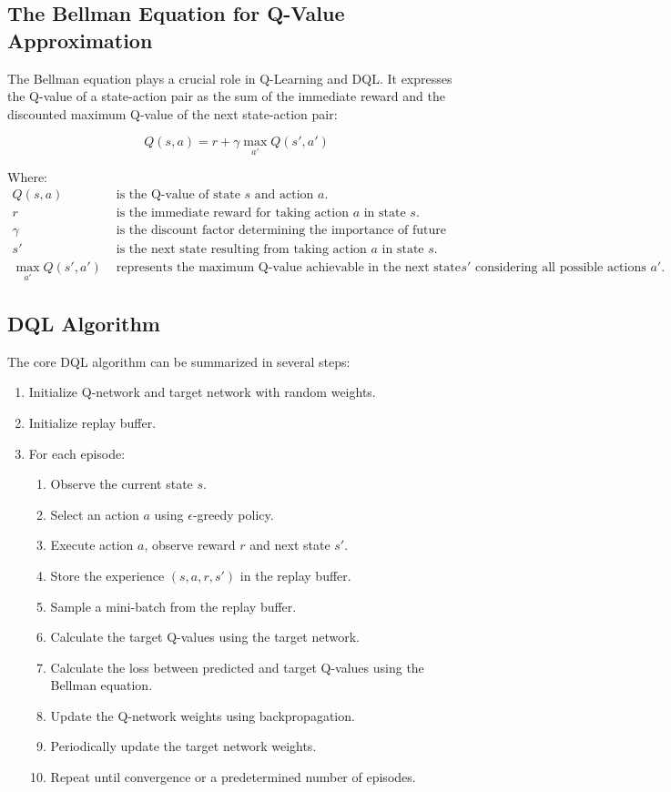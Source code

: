 \documentclass{scrartcl}
\begin{document}
\subsection{The Bellman Equation for Q-Value Approximation}

The Bellman equation plays a crucial role in Q-Learning and DQL. It expresses the Q-value of a state-action pair as the sum of the immediate reward and the discounted maximum Q-value of the next state-action pair:

\[
Q(s, a) = r + \gamma \max_{a'} Q(s', a')
\]

Where:
\begin{align*}
Q(s, a) & \text{ is the Q-value of state }s\text{ and action }a. \\
r & \text{ is the immediate reward for taking action }a\text{ in state }s. \\
\gamma & \text{ is the discount factor determining the importance of future rewards.} \\
s' & \text{ is the next state resulting from taking action }a\text{ in state }s. \\
\max_{a'} Q(s', a') & \text{ represents the maximum Q-value achievable in the next state }s'\text{ considering all possible actions }a'.
\end{align*}

\subsection{DQL Algorithm}

The core DQL algorithm can be summarized in several steps:

\begin{enumerate}
\item Initialize Q-network and target network with random weights.
\item Initialize replay buffer.
\item For each episode:
   \begin{enumerate}
   \item Observe the current state $s$.
   \item Select an action $a$ using $\epsilon$-greedy policy.
   \item Execute action $a$, observe reward $r$ and next state $s'$.
   \item Store the experience $(s, a, r, s')$ in the replay buffer.
   \item Sample a mini-batch from the replay buffer.
   \item Calculate the target Q-values using the target network.
   \item Calculate the loss between predicted and target Q-values using the Bellman equation.
   \item Update the Q-network weights using backpropagation.
   \item Periodically update the target network weights.
   \item Repeat until convergence or a predetermined number of episodes.
   \end{enumerate}
\end{enumerate}
\end{document}
